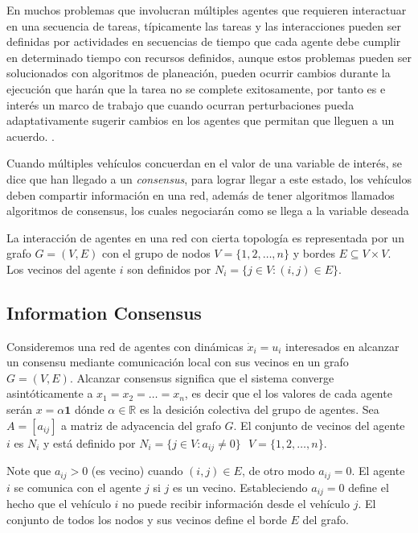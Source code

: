 

En muchos problemas que involucran múltiples agentes que requieren interactuar en una secuencia de tareas, típicamente las tareas y las interacciones pueden ser definidas por actividades en secuencias de tiempo que cada agente debe cumplir en determinado tiempo con recursos definidos, aunque estos problemas pueden ser solucionados con algoritmos de planeación, pueden ocurrir cambios durante la ejecución que harán que la tarea no se complete exitosamente, por tanto es e interés un marco de trabajo que cuando ocurran perturbaciones pueda adaptativamente sugerir cambios en los agentes  que permitan que lleguen a un acuerdo.   \cite{Decentralized_adaptive_scheduling}.

Cuando múltiples vehículos concuerdan en el valor de una variable de interés, se dice que han llegado a un \textit{consensus}, para lograr llegar a este estado, los vehículos deben compartir información en una red, además de tener algoritmos llamados algoritmos de consensus, los cuales negociarán como se llega a la variable deseada  \cite{DistributedConsensusinMulti}

La interacción de agentes en una red con cierta topología es representada por un grafo $G=(V,E)$ con el grupo de nodos $V=\{ 1,2,\ldots,n\}$ y bordes $E\subseteq V \times V$. Los vecinos del agente $i$ son definidos por $N_i=\{j \in V :(i,j)\in E\}$.


\subsection{Information Consensus}
Consideremos una red de agentes con dinámicas $\dot{x}_i=u_i$ interesados en alcanzar un consensu mediante comunicación local con sus vecinos en un grafo $G=(V,E)$. Alcanzar consensus significa que el sistema converge asintóticamente a $x_1=x_2=\ldots =x_n$, es decir que el los valores de cada agente serán $x=\alpha\textbf{1}$ dónde $\alpha \in \mathbb{R}$ es la desición colectiva del grupo de agentes. Sea $A=[a_{ij}]$ a matriz de adyacencia del grafo $G$. El conjunto de vecinos del agente $i$ es $N_i$ y está definido por $N_i=\{j\in V:a_{ij}\neq 0 \} \ \ \ V=\{1,2,\ldots,n \}$.

Note que $a_{ij}>0$ (es vecino) cuando $(i,j)\in E$, de otro modo $a_{ij}=0$. El agente $i$ se comunica con el agente $j$ si $j$ es un vecino.
Estableciendo $a_{ij}=0$ define el hecho que el vehículo $i$ no puede recibir información desde el vehículo $j$. 
El conjunto de todos los nodos y sus vecinos define el borde $E$ del grafo. 


